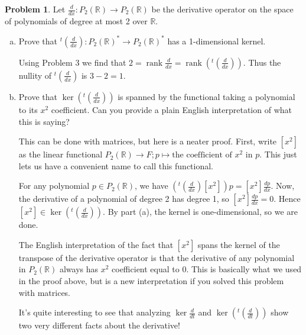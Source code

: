 \documentclass[11pt,oneside]{amsart}
\theoremstyle{definition}
\newtheorem{problem}{Problem}
\newcommand{\bR}{\mathbb{R}}
\newcommand{\eps}{\varepsilon}
\DeclareMathOperator{\rank}{rank}
\begin{document}
    \begin{problem}
        Let $\frac d{dx}\colon P_2(\bR)\to P_2(\bR)$ be the derivative operator on the space of polynomials of degree at most 2 over $\bR$.
        \begin{enumerate}[(a)]
            \item Prove that $^t(\frac d{dx})\colon P_2(\bR)^*\to P_2(\bR)^*$ has a 1-dimensional kernel.
            \begin{solution}
                Using Problem 3 we find that $2=\rank \frac d{dx}=\rank(^t(\frac d{dx}))$. Thus the nullity of $^t(\frac d{dx})$ is $3-2=1$.
            \end{solution}
            \item Prove that $\ker(^t(\frac d{dx}))$ is spanned by the functional taking a polynomial to its $x^2$ coefficient. Can you provide a plain English interpretation of what this is saying?
            \begin{solution}
                This can be done with matrices, but here is a neater proof. First, write $[x^2]$ as the linear functional $P_2(\bR)\to F; p\mapsto \text{the coefficient of }x^2\text{ in }p$. This just lets us have a convenient name to call this functional.
                
                For any polynomial $p\in P_2(\bR)$, we have $(^t(\frac d{dx})[x^2])p=[x^2]\frac{dp}{dx}$. Now, the derivative of a polynomial of degree 2 has degree 1, so $[x^2]\frac{dp}{dx}=0$. Hence $[x^2]\in\ker (^t(\frac d{dx}))$. By part (a), the kernel is one-dimensional, so we are done.

                The English interpretation of the fact that $[x^2]$ spans the kernel of the transpose of the derivative operator is that the derivative of any polynomial in $P_2(\bR)$ always has $x^2$ coefficient equal to 0. This is basically what we used in the proof above, but is a new interpretation if you solved this problem with matrices.

                It's quite interesting to see that analyzing $\ker\frac d{dt}$ and $\ker(^t(\frac d{dt}))$ show two very different facts about the derivative!
            \end{solution}
        \end{enumerate}
    \end{problem}
\end{document}
